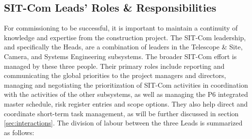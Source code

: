 \documentclass[SE,lsstdraft,authoryear,toc]{lsstdoc}
\begin{document}
\subsection{SIT-Com Leads’ Roles \& Responsibilities}
\label{sec:r_and_rs}

For commissioning to be successful, it is important to maintain a continuity of knowledge and expertise from the construction project.
The SIT-Com leadership, and specifically the Heads, are a combination of leaders in the Telescope \& Site, Camera, and Systems Engineering subsystems.
The broader SIT-Com effort is managed by these three people.
Their primary roles include reporting and communicating the global priorities to the project managers and directors, managing and negotiating the prioritization of SIT-Com activities in coordination with the activities of the other subsystems, as well as managing the P6 integrated master schedule, risk register entries and scope options.
They also help direct and coordinate short-term task management, as will be further discussed in section \ref{sec:interactions}.
The division of labour between the three Leads is summarized as follows:
\end{document}
